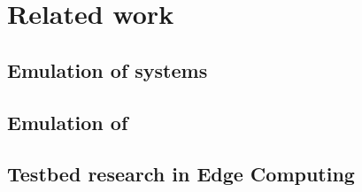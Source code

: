 \section{Related work}

\subsection{Emulation of  systems}

\subsection{Emulation of }

\subsection{Testbed research in Edge Computing}